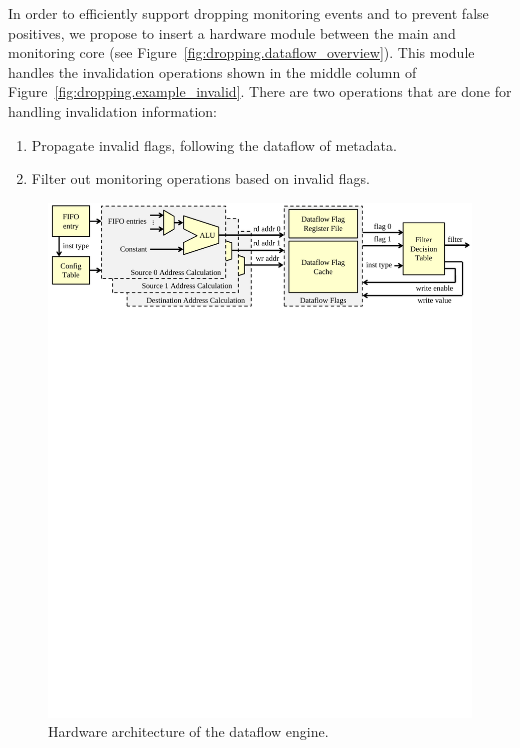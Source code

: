 In order to efficiently support dropping monitoring events and to prevent false
positives, we propose to insert a hardware module between the main and
monitoring core (see Figure~\ref{fig:dropping.dataflow_overview}). 
This module handles the invalidation operations shown in the middle column of
Figure~\ref{fig:dropping.example_invalid}.
There are two operations that are done for handling invalidation information:

\begin{enumerate}
  \item Propagate invalid flags, following the dataflow of metadata.
  \item Filter out monitoring operations based on invalid flags.
\end{enumerate}

\begin{figure}
  \begin{center}
    \includegraphics[width=\linewidth]{figs/dataflow_architecture.pdf}
    \vspace{-0.2in}
    \caption{Hardware architecture of the dataflow engine.}
    \label{fig:dropping.dataflow} 
    \vspace{-0.1in}
  \end{center}
\end{figure}

